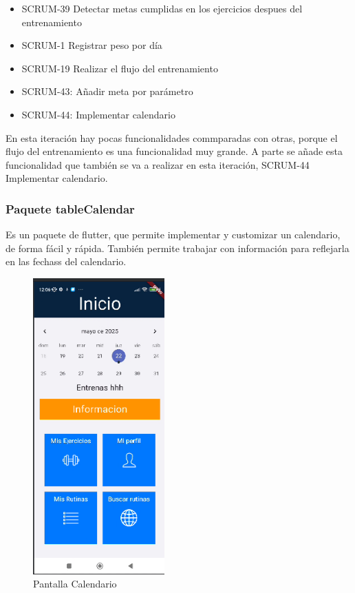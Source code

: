\begin{itemize}
	  \item SCRUM-39 Detectar metas cumplidas en los ejercicios despues del entrenamiento
	  \item SCRUM-1 Registrar peso por día
	  \item SCRUM-19 Realizar el flujo del entrenamiento
	  \item SCRUM-43: Añadir meta por parámetro
	  \item SCRUM-44: Implementar calendario
\end{itemize}

En esta iteración hay pocas funcionalidades commparadas con otras, porque el flujo del entrenamiento es una funcionalidad muy grande. A parte se añade esta funcionalidad que también se va a realizar en esta iteración, SCRUM-44 Implementar calendario.

\subsubsection{Paquete tableCalendar}

Es un paquete de flutter, que permite implementar y customizar un calendario, de forma fácil y rápida. También permite trabajar con información para reflejarla en las fechass del calendario.

\begin{figure}[h!]
    \centering
    \includegraphics[width=0.45\textwidth]{fotos/PantallaCalendario.png}
    \caption{Pantalla Calendario}
    \label{fig:Pantalla Calendario}
\end{figure}

